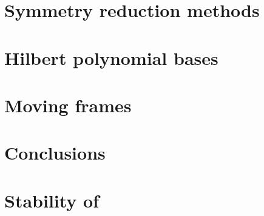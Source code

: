 \documentclass[aps,prl,preprint,superscriptaddress]{revtex4}
\begin{document}
\subsection{\label{s:introCLE} \CLe}
    

\section{\label{s:symRedGeneral} Symmetry reduction methods}
    

\section{\label{s:Hilbert} Hilbert polynomial bases}
    

\section{\label{sec:mf} Moving frames}
    
    
    
    


\section{Conclusions}
    

\appendix

\section{\label{s:StabReq} Stability of \reqva}
    




    
    
\end{document}
